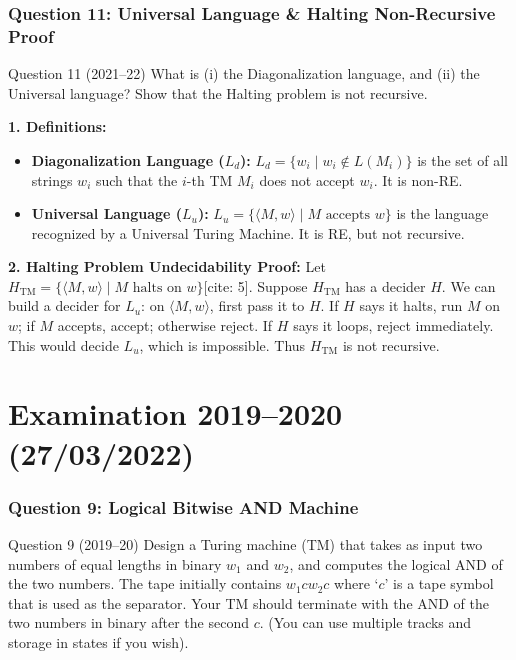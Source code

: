 \documentclass[11pt,a4paper]{article}
\begin{document}
\section{Question 11: Universal Language \& Halting Non-Recursive Proof}
\begin{questionbox}{Question 11 (2021--22)}
What is (i) the Diagonalization language, and (ii) the Universal language? Show that the Halting problem is not recursive.
\end{questionbox}

\begin{solutionbox}
\textbf{1. Definitions:}
\begin{itemize}[leftmargin=*]
    \item \textbf{Diagonalization Language ($L_d$):} $L_d = \{w_i \mid w_i \notin L(M_i)\}$ is the set of all strings $w_i$ such that the $i$-th TM $M_i$ does not accept $w_i$. It is non-RE.
    \item \textbf{Universal Language ($L_u$):} $L_u = \{\langle M, w \rangle \mid M \text{ accepts } w\}$ is the language recognized by a Universal Turing Machine. It is RE, but not recursive.
\end{itemize}

\textbf{2. Halting Problem Undecidability Proof:}
Let $H_{\text{TM}} = \{\langle M, w \rangle \mid M \text{ halts on } w\}$[cite: 5]. Suppose $H_{\text{TM}}$ has a decider $H$. We can build a decider for $L_u$: on $\langle M, w \rangle$, first pass it to $H$. If $H$ says it halts, run $M$ on $w$; if $M$ accepts, accept; otherwise reject. If $H$ says it loops, reject immediately. This would decide $L_u$, which is impossible. Thus $H_{\text{TM}}$ is not recursive.
\end{solutionbox}

\part{Examination 2019--2020 (27/03/2022)}

\section{Question 9: Logical Bitwise AND Machine}
\begin{questionbox}{Question 9 (2019--20)}
Design a Turing machine (TM) that takes as input two numbers of equal lengths in binary $w_1$ and $w_2$, and computes the logical AND of the two numbers. The tape initially contains $w_1 c w_2 c$ where `$c$' is a tape symbol that is used as the separator. Your TM should terminate with the AND of the two numbers in binary after the second $c$. (You can use multiple tracks and storage in states if you wish).
\end{questionbox}
\end{document}

